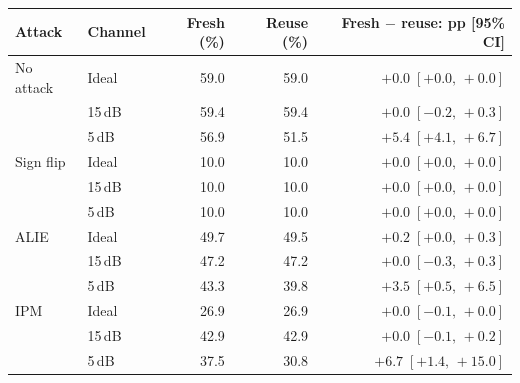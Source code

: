 \begin{tabular}{@{}llrrr@{}}
\toprule
Attack & Channel & Fresh (\%) & Reuse (\%) & Fresh $-$ reuse: pp [95\% CI] \\
\midrule
No attack & Ideal & 59.0 & 59.0 & $+0.0\;[+0.0,\,+0.0]$ \\
 & 15\,dB & 59.4 & 59.4 & $+0.0\;[-0.2,\,+0.3]$ \\
 & 5\,dB & 56.9 & 51.5 & $+5.4\;[+4.1,\,+6.7]$ \\
\midrule
Sign flip & Ideal & 10.0 & 10.0 & $+0.0\;[+0.0,\,+0.0]$ \\
 & 15\,dB & 10.0 & 10.0 & $+0.0\;[+0.0,\,+0.0]$ \\
 & 5\,dB & 10.0 & 10.0 & $+0.0\;[+0.0,\,+0.0]$ \\
\midrule
ALIE & Ideal & 49.7 & 49.5 & $+0.2\;[+0.0,\,+0.3]$ \\
 & 15\,dB & 47.2 & 47.2 & $+0.0\;[-0.3,\,+0.3]$ \\
 & 5\,dB & 43.3 & 39.8 & $+3.5\;[+0.5,\,+6.5]$ \\
\midrule
IPM & Ideal & 26.9 & 26.9 & $+0.0\;[-0.1,\,+0.0]$ \\
 & 15\,dB & 42.9 & 42.9 & $+0.0\;[-0.1,\,+0.2]$ \\
 & 5\,dB & 37.5 & 30.8 & $+6.7\;[+1.4,\,+15.0]$ \\
\bottomrule
\end{tabular}
